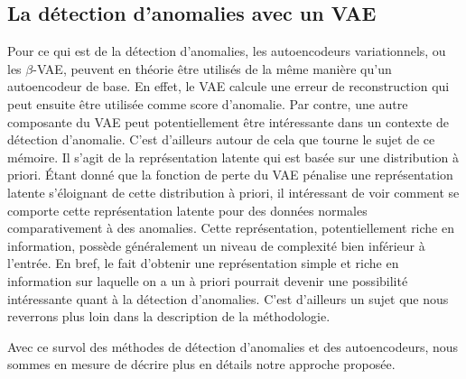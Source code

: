 \subsection{La détection d'anomalies avec un VAE}

Pour ce qui est de la détection d'anomalies, les autoencodeurs variationnels, ou les $\beta$-VAE, peuvent en théorie être utilisés de la même manière qu'un autoencodeur de base. En effet, le VAE calcule une erreur de reconstruction qui peut ensuite être utilisée comme score d'anomalie. Par contre, une autre composante du VAE peut potentiellement être intéressante dans un contexte de détection d'anomalie. C'est d'ailleurs autour de cela que tourne le sujet de ce mémoire. Il s'agit de la représentation latente qui est basée sur une distribution à priori. Étant donné que la fonction de perte du VAE pénalise une représentation latente s'éloignant de cette distribution à priori, il intéressant de voir comment se comporte cette représentation latente pour des données normales comparativement à des anomalies. Cette représentation, potentiellement riche en information, possède généralement un niveau de complexité bien inférieur à l'entrée. En bref, le fait d'obtenir une représentation simple et riche en information sur laquelle on a un à priori pourrait devenir une possibilité intéressante quant à la détection d'anomalies. C'est d'ailleurs un sujet que nous reverrons plus loin dans la description de la méthodologie.

Avec ce survol des méthodes de détection d'anomalies et des autoencodeurs, nous sommes en mesure de décrire plus en détails notre approche proposée.
